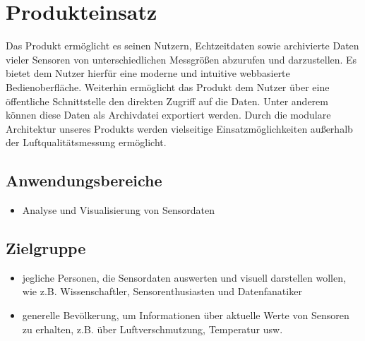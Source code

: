 \chapter{Produkteinsatz}
Das Produkt ermöglicht es seinen Nutzern, Echtzeitdaten sowie archivierte Daten vieler Sensoren von unterschiedlichen Messgrößen abzurufen und darzustellen. Es bietet dem Nutzer hierfür eine moderne und intuitive webbasierte Bedienoberfläche. Weiterhin ermöglicht das Produkt dem Nutzer über eine öffentliche Schnittstelle den direkten Zugriff auf die Daten. Unter anderem können diese Daten als Archivdatei exportiert werden. Durch die modulare Architektur unseres Produkts werden vielseitige Einsatzmöglichkeiten außerhalb der Luftqualitätsmessung ermöglicht.
\section{Anwendungsbereiche}
\begin{itemize}
	\item Analyse und Visualisierung von Sensordaten
\end{itemize}
\section{Zielgruppe}
\begin{itemize}
	\item jegliche Personen, die Sensordaten auswerten und visuell darstellen wollen, wie z.B. Wissenschaftler, Sensorenthusiasten und Datenfanatiker
	\item generelle Bevölkerung, um Informationen über aktuelle Werte von Sensoren zu erhalten, z.B. über Luftverschmutzung, Temperatur usw.
\end{itemize}
